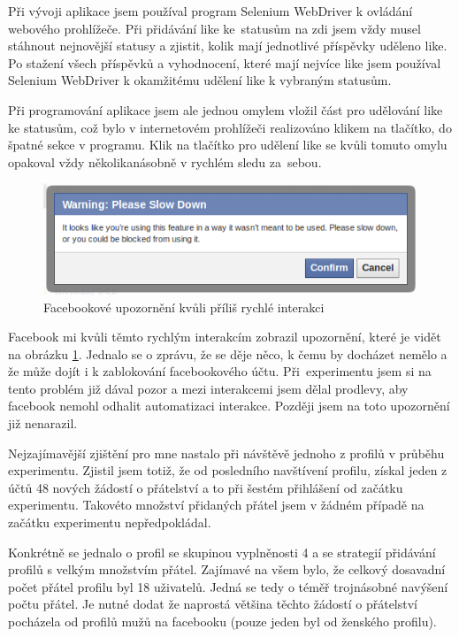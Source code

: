 \documentclass[thesis=M,czech]{FITthesis}[2013/05/10]
\begin{document}
Při vývoji aplikace jsem používal program Selenium WebDriver k ovládání webového prohlížeče. Při přidávání like ke~statusům na zdi jsem vždy musel stáhnout nejnovější statusy a zjistit, kolik mají jednotlivé příspěvky uděleno like. Po stažení všech příspěvků a vyhodnocení, které mají nejvíce like jsem používal Selenium WebDriver k okamžitému udělení like k vybraným statusům. 

Při programování aplikace jsem ale jednou omylem vložil část pro udělování like ke statusům, což bylo v internetovém prohlížeči realizováno klikem na tlačítko, do špatné sekce v programu. Klik na tlačítko pro udělení like se kvůli tomuto omylu opakoval vždy několikanásobně v rychlém sledu za~sebou.

\begin{figure}[h]
\begin{center}
\includegraphics[width=5in]{figures/slowDown.png}
\caption{Facebookové upozornění kvůli příliš rychlé interakci}
\label{fig:slowDown}
\end{center}
\end{figure}

Facebook mi kvůli těmto rychlým interakcím zobrazil upozornění, které je vidět na obrázku \ref{fig:slowDown}. Jednalo se o zprávu, že se děje něco, k čemu by docházet nemělo a že může dojít i k zablokování facebookového účtu. Při~experimentu jsem si na tento problém již dával pozor a mezi interakcemi jsem dělal prodlevy, aby facebook nemohl odhalit automatizaci interakce. Později jsem na toto upozornění již nenarazil.

Nejzajímavější zjištění pro mne nastalo při návštěvě jednoho z profilů v průběhu experimentu. Zjistil jsem totiž, že od posledního navštívení profilu, získal jeden z účtů 48 nových žádostí o přátelství a to při šestém přihlášení od začátku experimentu. Takovéto množství přidaných přátel jsem v žádném případě na začátku experimentu nepředpokládal.

Konkrétně se jednalo o profil se skupinou vyplněnosti 4 a se strategií přidávání profilů s velkým množstvím přátel. Zajímavé na všem bylo, že celkový dosavadní počet přátel profilu byl 18 uživatelů. Jedná se tedy o téměř trojnásobné navýšení počtu přátel. Je nutné dodat že naprostá většina těchto žádostí o přátelství pocházela od profilů mužů na facebooku (pouze jeden byl od ženského profilu).
\end{document}
